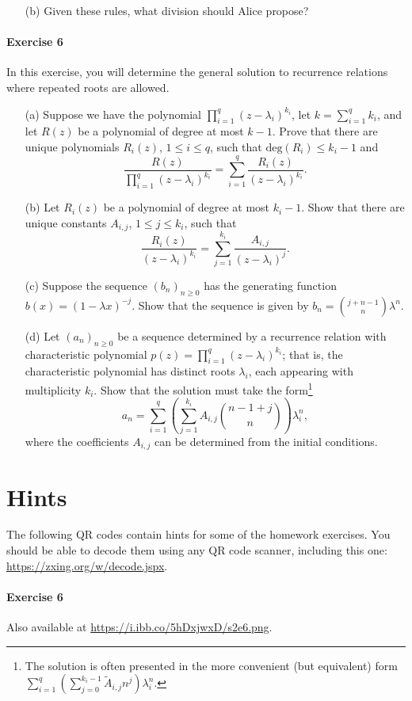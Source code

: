 \documentclass[a4paper,12pt]{article}
\renewcommand{\deg}{\textrm{deg}}
\begin{document}
\begin{itemize}
	\item[(b)] Given these rules, what division should Alice propose?
\end{itemize}

\paragraph{Exercise 6}  In this exercise, you will determine the general solution to recurrence relations where repeated roots are allowed.

\begin{itemize}
	\item[(a)] Suppose we have the polynomial $\prod_{i=1}^q \left( z - \lambda_i \right)^{k_i}$, let $k = \sum_{i=1}^q k_i$, and let $R(z)$ be a polynomial of degree at most $k-1$. Prove that there are unique polynomials $R_i(z)$, $1 \le i \le q$, such that $\deg(R_i) \le k_i - 1$ and 
\[ \frac{R(z)}{\prod_{i=1}^q ( z - \lambda_i )^{k_i}} = \sum_{i=1}^q \frac{R_i(z)}{ (z - \lambda_i )^{k_i} }. \]
	\item[(b)] Let $R_i(z)$ be a polynomial of degree at most $k_i - 1$. Show that there are unique constants $A_{i,j}$, $1 \le j \le k_i$, such that
\[ \frac{R_i(z)}{(z - \lambda_i)^{k_i}} = \sum_{j=1}^{k_i} \frac{A_{i,j}}{(z - \lambda_i)^j}. \]
	\item[(c)] Suppose the sequence $(b_n)_{n \ge 0}$ has the generating function $b(x) = (1 - \lambda x)^{-j}$.  Show that the sequence is given by $b_n = \binom{j + n - 1}{n} \lambda^n$.
	\item[(d)] Let $(a_n)_{n \ge 0}$ be a sequence determined by a recurrence relation with characteristic polynomial $p(z) = \prod_{i = 1}^q (z - \lambda_i)^{k_i}$; that is, the characteristic polynomial has distinct roots $\lambda_i$, each appearing with multiplicity $k_i$.  Show that the solution must take the form\footnote{The solution is often presented in the more convenient (but equivalent) form $\sum_{i=1}^q \left( \sum_{j=0}^{k_i - 1} \tilde{A}_{i,j} n^{j} \right) \lambda_i^n$.}
\[ a_n = \sum_{i=1}^q \left( \sum_{j = 1}^{k_i} A_{i,j} \binom{n-1+j}{n} \right) \lambda_i^n, \]
where the coefficients $A_{i,j}$ can be determined from the initial conditions.
\end{itemize}

\newpage

\section*{Hints}  The following QR codes contain hints for some of the homework exercises.  You should be able to decode them using any QR code scanner, including this one: \url{https://zxing.org/w/decode.jspx}.

\paragraph{Exercise 6} Also available at \url{https://i.ibb.co/5hDxjwxD/s2e6.png}.

\end{document}
